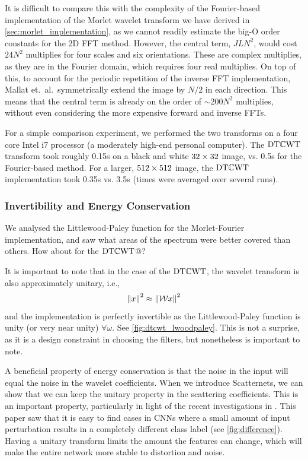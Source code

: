   It is difficult to compare this with the complexity of the Fourier-based
  implementation of the Morlet wavelet transform we have derived in
  \autoref{sec:morlet_implementation}, as we cannot readily estimate the big-O
  order constants for the 2D FFT method. However, the central term, $JLN^2$,
  would cost $24N^2$ multiplies for four scales and six orientations. These are
  complex multiplies, as they are in the Fourier domain, which requires
  four real multiplies. On top of this, to account for the periodic repetition 
  of the inverse FFT implementation, Mallat et.\ al.\ symmetrically extend the image by
  $N/2$ in each direction. This means that the central term is already on the
  order of $\sim 200N^2$ multiplies, without even considering the more
  expensive forward and inverse FFTs. 

  For a simple comparison experiment, we performed the two transforms on a four
  core Intel i7 processor (a moderately high-end personal computer). The
  $\mathrm{DT}\mathbb{C}\mathrm{WT}$ transform took roughly 0.15s on a black and
  white $32\times 32$ image, vs. 0.5s for the Fourier-based method. For a larger,
  $512\times 512$ image, the $\mathrm{DT}\mathbb{C}\mathrm{WT}$ implementation took 0.35s vs. 3.5s
  (times were averaged over several runs).
  
\subsubsection{Invertibility and Energy Conservation}
  We analysed the Littlewood-Paley function for the Morlet-Fourier
  implementation, and saw what areas of the spectrum were better covered than
  others. How about for the $\mathrm{DT}\mathbb{C}\mathrm{WT}$@?

  It is important to note that in the case of the $\mathrm{DT}\mathbb{C}\mathrm{WT}$, the wavelet
  transform is also approximately unitary, i.e.,\
  \begin{equation}
    \left\lVert x \right\rVert^2 \approx \left\lVert \mathcal{W}x \right\rVert^2
  \end{equation}
  and the implementation is perfectly invertible as the Littlewood-Paley
  function is unity (or very near unity) $\forall \omega$. See
  \autoref{fig:dtcwt_lwoodpaley}. This is not a surprise, as it is a design
  constraint in choosing the filters, but nonetheless is important to note. 

  A beneficial property of energy conservation is that the noise in the input
  will equal the noise in the wavelet coefficients. When we introduce
  Scatternets, we can show that we can keep the unitary property in the
  scattering coefficients. This is an important property, particularly in light
  of the recent investigations in \citep{szegedy_intriguing_2013}. This paper
  saw that it is easy to find cases in CNNs where a small amount of input
  perturbation results in a completely different class label (see
  \autoref{fig:difference}). Having a unitary transform limits the
  amount the features can change, which will make the entire network more
  stable to distortion and noise.


